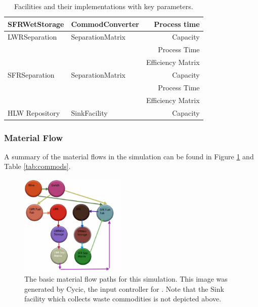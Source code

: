 \begin{table}
\begin{tabular}{|l|l|r|}
\hline
SFRWetStorage & CommodConverter & Process time\\
\hline
LWRSeparation & SeparationMatrix & Capacity\\
& & Process Time\\
& & Efficiency Matrix\\
\hline
SFRSeparation & SeparationMatrix & Capacity\\
& & Process Time\\
& & Efficiency Matrix\\
\hline
HLW Repository & SinkFacility & Capacity \\
\hline
\end{tabular}
\caption{Facilities and their implementations with key parameters.}
\label{tab:facimpl}
\end{table}

\subsubsection{Material Flow}
A summary of the material flows in the simulation can be found in Figure 
\ref{fig:cycic_img} and Table \ref{tab:commods}.

\begin{figure}[htpb!]
\begin{center}
\includegraphics[width=0.45\textwidth]{cycic_img.eps}
\end{center}
\caption{The basic material flow paths for this simulation. This image was 
generated by Cycic, the input controller for \Cyclus 
\cite{flanagan_input_2013}. Note that the Sink facility which collects waste 
commodities is not depicted above.}
\label{fig:cycic_img}
\end{figure}

